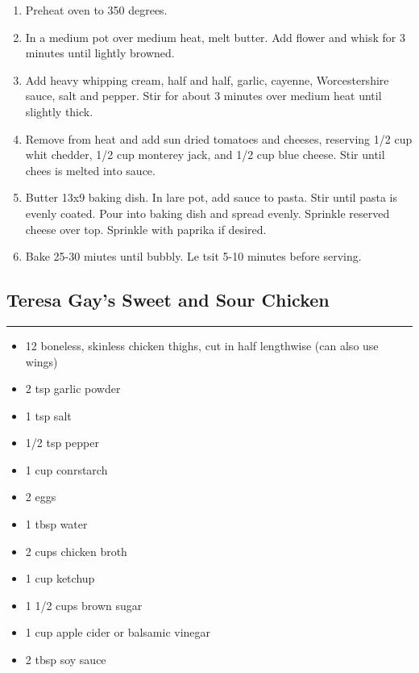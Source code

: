 \documentclass{article}
\begin{document}
\begin{enumerate}
    \item 
        Preheat oven to 350 degrees.
    \item 
        In a medium pot over medium heat, melt butter. Add flower and whisk for 3 minutes until lightly browned.
    \item 
        Add heavy whipping cream, half and half, garlic, cayenne, Worcestershire sauce, salt and pepper. Stir for about 3 minutes over medium heat until slightly thick.
    \item 
        Remove from heat and add sun dried tomatoes and cheeses, reserving 1/2 cup whit chedder, 1/2 cup monterey jack, and 1/2 cup blue cheese. Stir until chees is melted into sauce.
    \item 
        Butter 13x9 baking dish. In lare pot, add sauce to pasta. Stir until pasta is evenly coated. Pour into baking dish and spread evenly. Sprinkle reserved cheese over top. Sprinkle with paprika if desired.
    \item 
        Bake 25-30 miutes until bubbly. Le tsit 5-10 minutes before serving.
\end{enumerate}
\newpage

\subsection{Teresa Gay's Sweet and Sour Chicken} 
\noindent\rule[0.5ex]{\linewidth}{1pt}

\begin{framed}
\begin{itemize}
    \item 12 boneless, skinless chicken thighs, cut in half lengthwise (can also use wings)
    \item 2 tsp garlic powder
    \item 1 tsp salt
    \item 1/2 tsp pepper
    \item 1 cup conrstarch
    \item 2 eggs
    \item 1 tbsp water
    \item 2 cups chicken broth
    \item 1 cup ketchup
    \item 1 1/2 cups brown sugar
    \item 1 cup apple cider or balsamic vinegar
    \item 2 tbsp soy sauce
\end{itemize}
\end{framed}
\end{document}

